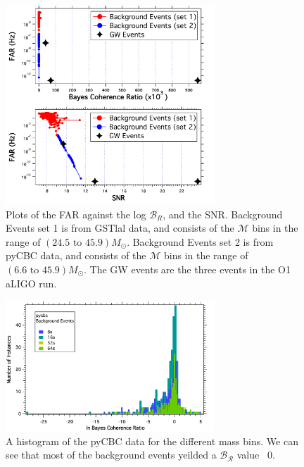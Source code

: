 \documentclass{article}
\begin{document}
  
  \begin{figure}[h]
  	\centering
  	\includegraphics[width=0.7\textwidth]{Figures/eventsOnBackground.pdf} 
  	\caption{Plots of the FAR against the log $\mathcal{B}_{R}$, and the SNR. Background Events set 1 is from GSTlal data, and consists of the $\mathcal{M}$ bins in the range of $(24.5  \text{ to } 45.9) M_{\odot}$. Background Events set 2 is from pyCBC data, and consists of the $\mathcal{M}$ bins in the range of $(6.6  \text{ to } 45.9) M_{\odot}$. The GW events are the three events in the O1 aLIGO run.}
  	\label{Fig:eventsOnBackgroundFINAL}
  \end{figure}
  
 
    
    \begin{figure}[h]
    	\centering
    	\includegraphics[width=0.7\textwidth]{Figures/lnBCRhistogram.png} 
    	\caption{A histogram of the pyCBC data for the different mass bins. We can see that most of the background events yeilded a $\mathcal{B_R}$ value ~0.}
    	\label{Fig:histogramBCR}
    \end{figure}
    
    
  
\end{document}
